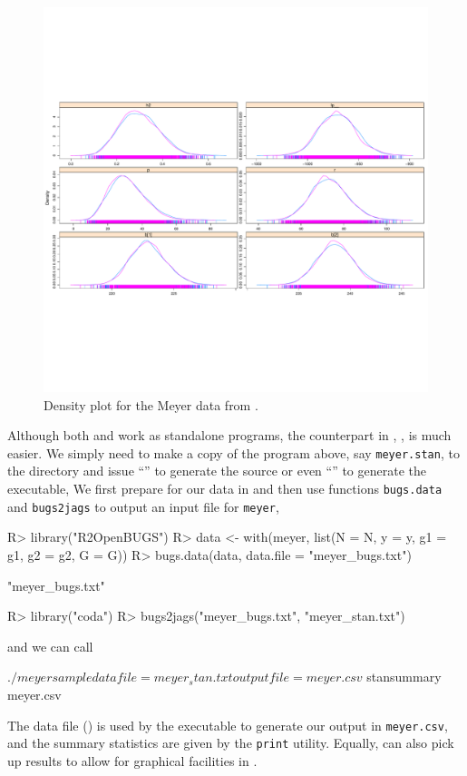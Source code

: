 \documentclass[article]{jss}
\begin{document}
\begin{figure}[t!]
\includegraphics[width=\textwidth, trim = 0 260 0 260, clip]{jss2367-010}
\centering
\caption{Density plot for the Meyer data from .}
\label{meyer:stan}
\end{figure}

Although both  and  work as standalone programs, 
the counterpart in , , is much easier. We simply 
need to make a copy of the program above, say \texttt{meyer.stan}, to the 
 directory and issue ``'' to generate the  
source or even ``'' to generate the executable, We first 
prepare for our data in  and then use functions 
\verb/bugs.data/ and \verb/bugs2jags/ to output an input file for \verb/meyer/,
%
\begin{Schunk}
\begin{Sinput}
R> library("R2OpenBUGS")
R> data <- with(meyer, list(N = N, y = y, g1 = g1, g2 = g2, G = G))
R> bugs.data(data, data.file = "meyer_bugs.txt")
\end{Sinput}
\begin{Soutput}
[1] "meyer_bugs.txt"
\end{Soutput}
\begin{Sinput}
R> library("coda")
R> bugs2jags("meyer_bugs.txt", "meyer_stan.txt")
\end{Sinput}
\end{Schunk}
%
and we can call
%
\begin{CodeChunk}
\begin{CodeInput}
$ ./meyer sample data file=meyer_stan.txt output file=meyer.csv
$ stansummary meyer.csv
\end{CodeInput}
\end{CodeChunk}
%
The data file () is used by the executable to generate our 
output in \texttt{meyer.csv}, and the summary statistics are given by the 
\verb/print/ utility. Equally,  can also pick up results to 
allow for graphical facilities in .
\end{document}
